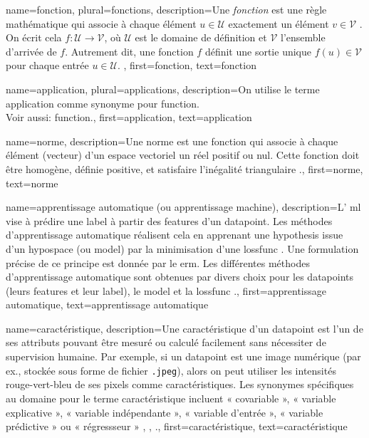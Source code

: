 
{name={fonction}, plural={fonctions}, 
	description={Une \emph{fonction} est une règle mathématique qui associe à chaque élément $u \in \mathcal{U}$ exactement un élément $v \in \mathcal{V}$ \cite{RudinBookPrinciplesMatheAnalysis}. 
		On écrit cela $f: \mathcal{U} \rightarrow \mathcal{V}$, où $\mathcal{U}$ est le domaine de définition
		et $\mathcal{V}$ l'ensemble d'arrivée de $f$. Autrement dit, une fonction $f$ définit une sortie unique 
		$f(u) \in \mathcal{V}$ pour chaque entrée $u \in \mathcal{U}$.
	},
	first={fonction},
	text={fonction} 
}

{name={application}, plural={applications}, 
	description={On utilise le terme application comme synonyme pour \gls{function}.
		\\
		Voir aussi: \gls{function}.},
	first={application},
	text={application}
}

{name={norme},
	description={Une norme est une fonction qui associe à chaque élément (vecteur) d’un espace vectoriel un réel positif ou nul. Cette fonction doit être homogène, définie positive, et satisfaire l’inégalité triangulaire \cite{HornMatAnalysis}.},
	first={norme}, text={norme}
}

{name={apprentissage automatique (ou apprentissage machine)},
	description={L’ \gls{ml} vise à prédire une \gls{label} à partir des \glspl{feature} d’un \gls{datapoint}. Les méthodes d’apprentissage automatique réalisent cela en apprenant une \gls{hypothesis} issue d’un \gls{hypospace} (ou \gls{model}) par la minimisation d’une \gls{lossfunc} \cite{MLBasics,HastieWainwrightBook}. Une formulation précise de ce principe est donnée par le \gls{erm}. Les différentes méthodes d’apprentissage automatique sont obtenues par divers choix pour les \glspl{datapoint} (leurs \glspl{feature} et leur \gls{label}), le \gls{model} et la \gls{lossfunc} \cite[Ch. 3]{MLBasics}.},
	first={apprentissage automatique}, text={apprentissage automatique}
}

{name={caractéristique},
	description={Une caractéristique d’un \gls{datapoint} est l’un de ses attributs pouvant être mesuré ou calculé facilement sans nécessiter de supervision humaine. Par exemple, si un \gls{datapoint} est une image numérique (par ex., stockée sous forme de fichier \texttt{.jpeg}), alors on peut utiliser les intensités rouge-vert-bleu de ses pixels comme caractéristiques.  
		Les synonymes spécifiques au domaine pour le terme caractéristique incluent « covariable », « variable explicative », « variable indépendante », « variable d’entrée », « variable prédictive » ou « régressseur » \cite{Gujarati2021}, \cite{Dodge2003}, \cite{Everitt2022}.},
	first={caractéristique},
	text={caractéristique}
}

